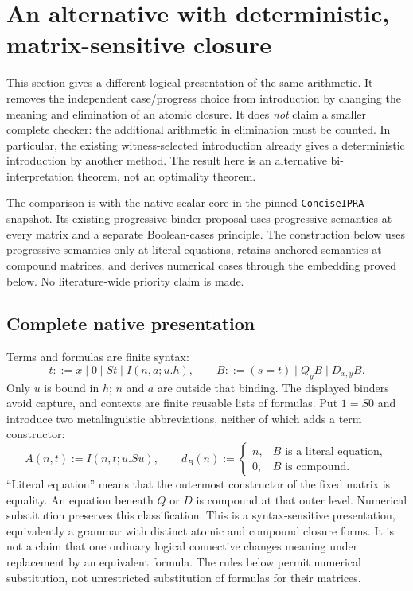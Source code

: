 
\section{An alternative with deterministic, matrix-sensitive closure}
\label{sec:mixed-closure}

This section gives a different logical presentation of the same arithmetic.
It removes the independent case/progress choice from introduction by changing
the meaning and elimination of an atomic closure.  It does \emph{not} claim
a smaller complete checker: the additional arithmetic in elimination must
be counted.  In particular, the existing witness-selected introduction
already gives a deterministic introduction by another method.  The result
here is an alternative bi-interpretation theorem, not an optimality theorem.

The comparison is with the native scalar core in the pinned
\texttt{ConciseIPRA} snapshot.  Its existing progressive-binder proposal uses
progressive semantics at every matrix and a separate Boolean-cases principle.
The construction below uses progressive semantics only at literal equations,
retains anchored semantics at compound matrices, and derives numerical cases
through the embedding proved below.  No literature-wide priority claim is made.

\subsection{Complete native presentation}

Terms and formulas are finite syntax:
\[
 t::=x\mid0\mid St\mid I(n,a;u.h),\qquad
 B::=(s=t)\mid Q_yB\mid D_{x,y}B.
\]
Only $u$ is bound in $h$; $n$ and $a$ are outside that binding.
The displayed binders avoid capture, and contexts are finite reusable
lists of formulas.  Put $1=S0$ and introduce two metalinguistic
abbreviations, neither of which adds a term constructor:
\[
 A(n,t):=I(n,t;u.Su),\qquad
 d_B(n):=
 \begin{cases}
 n,&B\text{ is a literal equation},\\
 0,&B\text{ is compound}.
 \end{cases}
 \tag{MC1}\label{eq:mc-data}
\]
``Literal equation'' means that the outermost constructor of the fixed
matrix is equality.  An equation beneath $Q$ or $D$ is compound at that
outer level.  Numerical substitution preserves this classification.
This is a syntax-sensitive presentation, equivalently a grammar with
distinct atomic and compound closure forms.  It is not a claim that
one ordinary logical connective changes meaning under replacement by
an equivalent formula.  The rules below permit numerical substitution,
not unrestricted substitution of formulas for their matrices.

